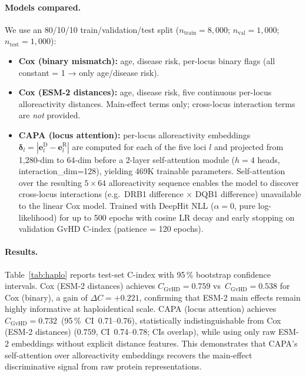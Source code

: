\documentclass[11pt,a4paper]{article}
\begin{document}
\paragraph{Models compared.}  We use an 80/10/10 train/validation/test split
($n_{\mathrm{train}}=8{,}000$; $n_{\mathrm{val}}=1{,}000$; $n_{\mathrm{test}}=1{,}000$):
\begin{itemize}
  \item \textbf{Cox (binary mismatch):} age, disease risk, per-locus binary flags
    (all constant = 1 → only age/disease risk).
  \item \textbf{Cox (ESM-2 distances):} age, disease risk, five continuous
    per-locus alloreactivity distances.  Main-effect terms only; cross-locus
    interaction terms are \emph{not} provided.
  \item \textbf{CAPA (locus attention):} per-locus alloreactivity embeddings
    $\boldsymbol{\delta}_l = |\mathbf{e}^{\mathrm{D}}_l - \mathbf{e}^{\mathrm{R}}_l|$
    are computed for each of the five loci $l$ and projected from 1{,}280-dim to
    64-dim before a 2-layer self-attention module ($h=4$ heads, interaction\_dim=128),
    yielding 469K trainable parameters.  Self-attention over the resulting
    $5\!\times\!64$ alloreactivity sequence enables the model to discover
    cross-locus interactions (e.g.\ DRB1 difference $\times$ DQB1 difference)
    unavailable to the linear Cox model.  Trained with DeepHit NLL
    ($\alpha=0$, pure log-likelihood) for up to 500 epochs with cosine LR decay
    and early stopping on validation GvHD C-index (patience = 120 epochs).
\end{itemize}

\paragraph{Results.}
Table~\ref{tab:haplo} reports test-set C-index with 95\,\% bootstrap confidence
intervals.  Cox (ESM-2 distances) achieves $C_{\mathrm{GvHD}} = 0.759$ vs\
$C_{\mathrm{GvHD}} = 0.538$ for Cox (binary), a gain of $\Delta C = +0.221$,
confirming that ESM-2 main effects remain highly informative at haploidentical
scale.  CAPA (locus attention) achieves $C_{\mathrm{GvHD}} = 0.732$~(95\,\%~CI~0.71--0.76),
statistically indistinguishable from Cox (ESM-2 distances) ($0.759$, CI~0.74--0.78;
CIs overlap), while using only raw ESM-2 embeddings without explicit distance
features.  This demonstrates that CAPA's self-attention over alloreactivity
embeddings recovers the main-effect discriminative signal from raw protein
representations.
\end{document}
